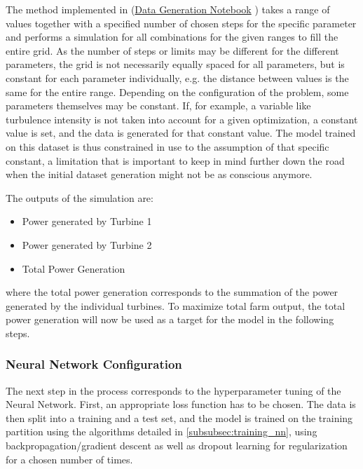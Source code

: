 The method implemented in (\href{https://github.com/schmeti/uc3m_TFM_wind_farm_optimization_codebase/blob/main/Windfarm_power_modelling/generate_data_floris.ipynb}{Data Generation Notebook} \cite{schmetz2025_gendata_git}) takes a range of values together with a specified number of chosen steps for the specific parameter and performs a simulation for all combinations for the given ranges to fill the entire grid. As the number of steps or limits may be different for the different parameters, the grid is not necessarily equally spaced for all parameters, but is constant for each parameter individually, e.g. the distance between values is the same for the entire range.  
Depending on the configuration of the problem, some parameters themselves may be constant. If, for example, a variable like turbulence intensity is not taken into account for a given optimization, a constant value is set, and the data is generated for that constant value. The model trained on this dataset is thus constrained in use to the assumption of that specific constant, a limitation that is important to keep in mind further down the road when the initial dataset generation might not be as conscious anymore. 

The outputs of the simulation are:
\begin{itemize}
	\item Power generated by Turbine 1
	\item Power generated by Turbine 2
	\item Total Power Generation
\end{itemize}

where the total power generation corresponds to the summation of the power generated by the individual turbines. To maximize total farm output, the total power generation will now be used as a target for the model in the following steps.

\subsubsection{Neural Network Configuration}

The next step in the process corresponds to the hyperparameter tuning of the Neural Network. First, an appropriate loss function has to be chosen. The data is then split into a training and a test set, and the model is trained on the training partition using the algorithms detailed in  \ref{subsubsec:training_nn}, using backpropagation/gradient descent as well as dropout learning for regularization for a chosen number of times.  

